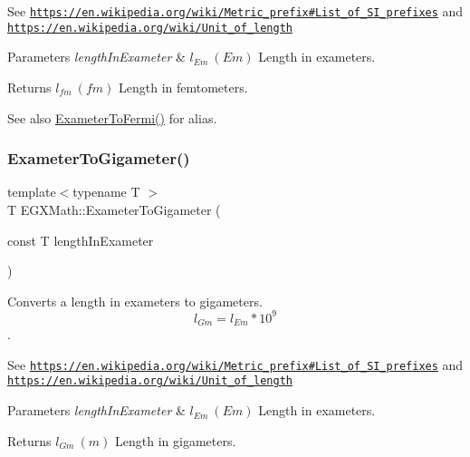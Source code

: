 See \href{https://en.wikipedia.org/wiki/Metric_prefix#List_of_SI_prefixes}{\tt https\+://en.\+wikipedia.\+org/wiki/\+Metric\+\_\+prefix\#\+List\+\_\+of\+\_\+\+S\+I\+\_\+prefixes} and \href{https://en.wikipedia.org/wiki/Unit_of_length}{\tt https\+://en.\+wikipedia.\+org/wiki/\+Unit\+\_\+of\+\_\+length} 
\begin{DoxyParams}{Parameters}
{\em length\+In\+Exameter} & $ l_{Em}\ (Em)$ Length in exameters. \\
\hline
\end{DoxyParams}
\begin{DoxyReturn}{Returns}
$ l_{fm}\ (fm)$ Length in femtometers. 
\end{DoxyReturn}
\begin{DoxySeeAlso}{See also}
\mbox{\hyperlink{group___e_g_x_math-_conversions-_length_conversions-_s_i-_exameter-_non-_s_i_ga0aa0524461cbce1fcc102b847545d212}{Exameter\+To\+Fermi()}} for alias. 
\end{DoxySeeAlso}
\mbox{\label{group___e_g_x_math-_conversions-_length_conversions-_s_i-_exameter-_s_i_gae0a019ba27e962c891f014ae4748fd14}} 
\subsubsection{\texorpdfstring{Exameter\+To\+Gigameter()}{ExameterToGigameter()}}
{\footnotesize\ttfamily template$<$typename T $>$ \\
T E\+G\+X\+Math\+::\+Exameter\+To\+Gigameter (\begin{DoxyParamCaption}\item[{const T}]{length\+In\+Exameter }\end{DoxyParamCaption})}



Converts a length in exameters to gigameters. \[ l_{Gm}=l_{Em} * 10^{9} \]. 

See \href{https://en.wikipedia.org/wiki/Metric_prefix#List_of_SI_prefixes}{\tt https\+://en.\+wikipedia.\+org/wiki/\+Metric\+\_\+prefix\#\+List\+\_\+of\+\_\+\+S\+I\+\_\+prefixes} and \href{https://en.wikipedia.org/wiki/Unit_of_length}{\tt https\+://en.\+wikipedia.\+org/wiki/\+Unit\+\_\+of\+\_\+length} 
\begin{DoxyParams}{Parameters}
{\em length\+In\+Exameter} & $ l_{Em}\ (Em)$ Length in exameters. \\
\hline
\end{DoxyParams}
\begin{DoxyReturn}{Returns}
$ l_{Gm}\ (m)$ Length in gigameters. 
\end{DoxyReturn}
\mbox{\label{group___e_g_x_math-_conversions-_length_conversions-_s_i-_exameter-_s_i_gaa8f58d36da35b834499715694c75ce99}} 
